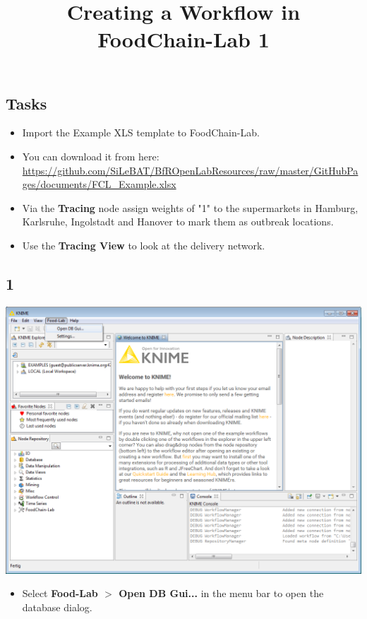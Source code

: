 \documentclass{beamer}
\title{Creating a Workflow in FoodChain-Lab 1}
\date{}
\begin{document}
\maketitle

\section{ }

\subsection{Tasks}
\begin{frame}
	\begin{itemize}
		\item Import the Example XLS template to FoodChain-Lab.
		\item You can download it from here: \url{https://github.com/SiLeBAT/BfROpenLabResources/raw/master/GitHubPages/documents/FCL_Example.xlsx}
		\item Via the \textbf{Tracing} node assign weights of "1" to the supermarkets in Hamburg, Karlsruhe, Ingolstadt and Hanover to mark them as outbreak locations.
		\item Use the \textbf{Tracing View} to look at the delivery network.
	\end{itemize}
\end{frame}
 
\subsection{1}
\begin{frame}
	\begin{center}
  		\includegraphics[height=0.6\textheight]{1.png}
	\end{center}
	\begin{itemize}
		\item Select \textbf{Food-Lab $>$ Open DB Gui...} in the menu bar to open the database dialog.
	\end{itemize}
\end{frame}
\end{document}
